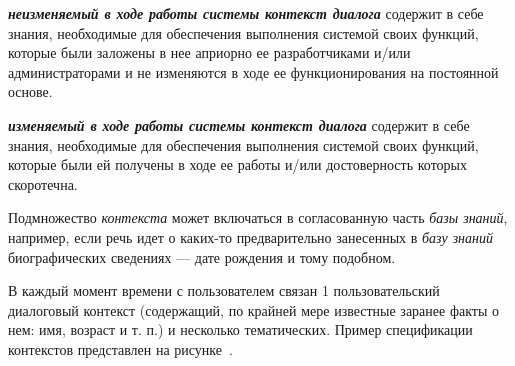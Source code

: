 \textbf{\textit{неизменяемый в ходе работы системы контекст диалога}} содержит в себе знания, необходимые для обеспечения выполнения системой своих функций,  которые были заложены в нее априорно ее разработчиками и/или администраторами и не изменяются в ходе ее функционирования на постоянной основе.

\textbf{\textit{изменяемый в ходе работы системы контекст диалога}} содержит в себе знания, необходимые для обеспечения выполнения системой своих функций,  которые были ей получены в ходе ее работы и/или достоверность которых скоротечна.

\begin{SCn}


    \begin{scnindent}
        \begin{scneqtoset}
        \end{scneqtoset}
    \end{scnindent}
    \begin{scnindent}
        \begin{scneqtoset}
        \end{scneqtoset}
    \end{scnindent}

\end{SCn}

Подмножество \textit{контекста} может включаться в согласованную часть \textit{базы знаний}, например, если речь идет о каких-то предварительно занесенных в \textit{базу знаний} биографических сведениях --- дате рождения и тому подобном.

В каждый момент времени с пользователем связан 1 пользовательский диалоговый контекст (содержащий, по крайней мере известные заранее факты о нем: имя, возраст и т. п.) и несколько тематических.
Пример спецификации контекстов представлен на рисунке~\textit{}.

